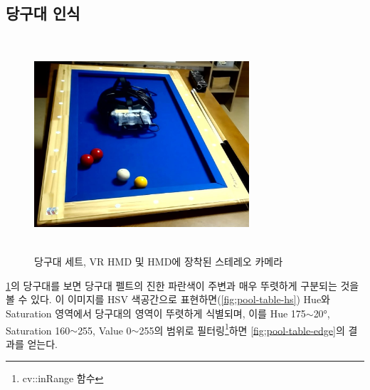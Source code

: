 \documentclass[11pt]{oblivoir}
\begin{document}
\subsection{당구대 인식}
\label{section;imgproc;table}
\begin{figure}[ht]
        \begin{center}
                \includegraphics[width=8cm, height=8cm, keepaspectratio]{img/billiards-table.png}
        \end{center}
        \caption[Caption for LOF]{당구대 세트, VR HMD 및 HMD에 장착된 스테레오 카메라\footnotemark}
        \label{fig;pool-table}
\end{figure}


\cref{fig;pool-table}의 당구대를 보면 당구대 펠트의 진한 파란색이 주변과 매우 뚜렷하게 구분되는 것을 볼 수 있다. 이 이미지를 HSV 색공간으로 표현하면(\cref{fig;pool-table-hs}) Hue와 Saturation 영역에서 당구대의 영역이 뚜렷하게 식별되며, 이를 Hue 175$\sim$20\si{\degree}, Saturation 160$\sim$255, Value 0$\sim$255의 범위로 필터링\footnote{cv::inRange 함수}하면 \cref{fig;pool-table-edge}의 결과를 얻는다.
\end{document}
